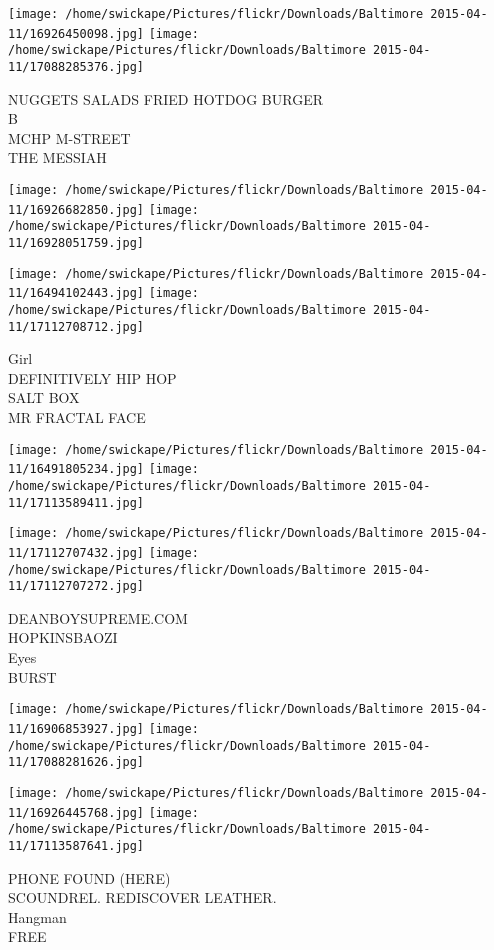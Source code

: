 \documentclass[10pt,letterpaper]{article}
\begin{document}
\texttt{[image: /home/swickape/Pictures/flickr/Downloads/Baltimore 2015-04-11/16926450098.jpg]}
\texttt{[image: /home/swickape/Pictures/flickr/Downloads/Baltimore 2015-04-11/17088285376.jpg]}

NUGGETS SALADS FRIED HOTDOG BURGER\\
B\\
MCHP M{-}STREET\\
THE MESSIAH
\pagebreak

\texttt{[image: /home/swickape/Pictures/flickr/Downloads/Baltimore 2015-04-11/16926682850.jpg]}
\texttt{[image: /home/swickape/Pictures/flickr/Downloads/Baltimore 2015-04-11/16928051759.jpg]}

\texttt{[image: /home/swickape/Pictures/flickr/Downloads/Baltimore 2015-04-11/16494102443.jpg]}
\texttt{[image: /home/swickape/Pictures/flickr/Downloads/Baltimore 2015-04-11/17112708712.jpg]}

Girl\\
DEFINITIVELY HIP HOP\\
SALT BOX\\
MR FRACTAL FACE
\pagebreak

\texttt{[image: /home/swickape/Pictures/flickr/Downloads/Baltimore 2015-04-11/16491805234.jpg]}
\texttt{[image: /home/swickape/Pictures/flickr/Downloads/Baltimore 2015-04-11/17113589411.jpg]}

\texttt{[image: /home/swickape/Pictures/flickr/Downloads/Baltimore 2015-04-11/17112707432.jpg]}
\texttt{[image: /home/swickape/Pictures/flickr/Downloads/Baltimore 2015-04-11/17112707272.jpg]}

DEANBOYSUPREME.COM\\
HOPKINSBAOZI\\
Eyes\\
BURST
\pagebreak

\texttt{[image: /home/swickape/Pictures/flickr/Downloads/Baltimore 2015-04-11/16906853927.jpg]}
\texttt{[image: /home/swickape/Pictures/flickr/Downloads/Baltimore 2015-04-11/17088281626.jpg]}

\texttt{[image: /home/swickape/Pictures/flickr/Downloads/Baltimore 2015-04-11/16926445768.jpg]}
\texttt{[image: /home/swickape/Pictures/flickr/Downloads/Baltimore 2015-04-11/17113587641.jpg]}

PHONE FOUND (HERE)\\
SCOUNDREL.  REDISCOVER LEATHER.\\
Hangman\\
FREE
\pagebreak
\end{document}
